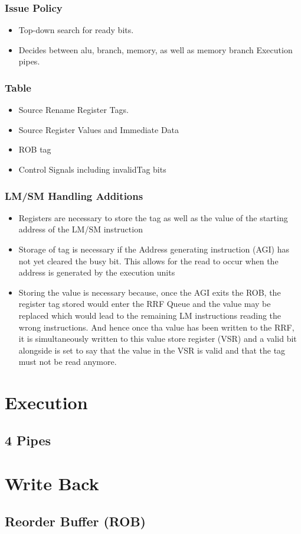 \documentclass{article}
\begin{document}
\subsubsection{Issue Policy}
\begin{itemize}
\item Top-down search for ready bits.
\item Decides between alu, branch, memory, as well as memory branch Execution pipes.
\end{itemize}
\subsubsection{Table}
\begin{itemize}
\item Source Rename Register Tags.
\item Source Register Values and Immediate Data
\item ROB tag
\item Control Signals including invalidTag bits
\end{itemize}
\subsubsection{LM/SM Handling Additions}
\begin{itemize}
\item Registers are necessary to store the tag as well as the value of the starting address of the LM/SM instruction
\item Storage of tag is necessary if the Address generating instruction (AGI) has not yet cleared the busy bit. This allows for the read to occur when the address is generated by the execution units
\item Storing the value is necessary because, once the AGI exits the ROB, the register tag stored would enter the RRF Queue and the value may be replaced which would lead to the remaining LM instructions reading the wrong instructions. And hence once tha value has been written to the RRF, it is simultaneously written to this value store register (VSR) and a valid bit alongside is set to say that the value in the VSR is valid and that the tag must not be read anymore.
\end{itemize}

\section{Execution}
\subsection{4 Pipes}

\section{Write Back}
\subsection{Reorder Buffer (ROB)}
\end{document}
